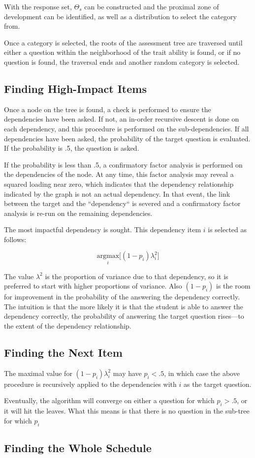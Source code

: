 With the response set, $\Theta_s$ can be constructed and the proximal zone of
development can be identified, as well as a distribution to select the category
from.  

Once a category is selected, the roots of the assessment tree are traversed
until either a question within the neighborhood of the trait ability is found,
or if no question is found, the traversal ends and another random category is
selected.

\subsection{Finding High-Impact Items}

Once a node on the tree is found, a check is performed to ensure the
dependencies have been asked.  If not, an in-order recursive descent is done on
each dependency, and this procedure is performed on the sub-dependencies.  If
all dependencies have been asked, the probability of the target question is
evaluated.  If the probability is .5, the question is asked. 

If the probability is less than .5, a confirmatory factor analysis is performed
on the dependencies of the node.  At any time, this factor analysis may reveal
a squared loading near zero, which indicates that the dependency relationship
indicated by the graph is not an actual dependency.  In that event, the link
between the target and the ``dependency`` is severed and a confirmatory factor
analysis is re-run on the remaining dependencies.

The most impactful dependency is sought.  This dependency item $i$ is selected
as follows: 

\begin{equation}
  \underset{i}{\mathrm{argmax}} \Bigg[ (1 - p_i) \lambda_i^2 \Bigg]
\end{equation}

The value $\lambda^2$ is the proportion of variance due to that dependency, so
it is preferred to start with higher proportions of variance.  Also $(1-p_i)$
is the room for improvement in the probability of the answering the dependency
correctly.  The intuition is that the more likely it is that the student is
able to answer the dependency correctly, the probability of answering the
target question rises---to the extent of the dependency relationship. 

\subsection{Finding the Next Item}

The maximal value for $(1 - p_i) \lambda_i^2$ may have $p_i < .5$, in which
case the above procedure is recursively applied to the dependencies with
$i$ as the target question.  

Eventually, the algorithm will converge on either a question for which $p_i >
.5$, or it will hit the leaves.  What this means is that there is no question
in the sub-tree for which $p_i$

\subsection{Finding the Whole Schedule}

